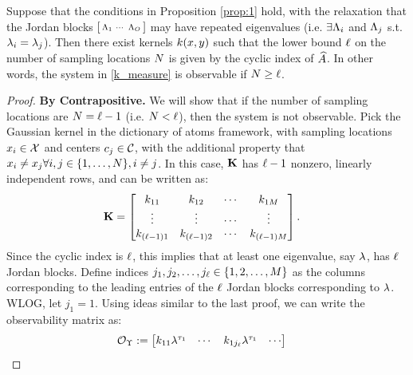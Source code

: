 \begin{proposition}\label{prop:2}
 Suppose that the conditions in Proposition \ref{prop:1} hold, with the relaxation that
 the Jordan blocks $\left[\begin{smallmatrix}
                           \Lambda_1 &\cdots & \Lambda_{O}
                          \end{smallmatrix}\right]$ may have 
 repeated eigenvalues (i.e. $\exists \Lambda_i$ and $\Lambda_j$ s.t. $\lambda_i = \lambda_j$). Then there exist kernels $k(x,y)$ such that the lower bound $\ell$ on the number of sampling locations $N$ is given by the cyclic index of $\widehat{A}$. In other words, the system in \eqref{k_measure} is observable if $ N \geq \ell$.
\end{proposition}
\begin{proof}
	\textbf{By Contrapositive.} We will show that if the number of sampling locations are $ N=\ell-1 $ (i.e. $ N < \ell$), then the system is not observable. Pick the Gaussian kernel in the dictionary of atoms framework,
	with sampling locations $x_i\in\mathcal{X}$ and centers $c_j\in\mathcal{C}$, with the additional 
	property that $x_i\neq x_j \forall i,j\in\{1,\dots,N\}, i\neq j$.
	In this case, 
	$\mathbf{K}$ has $\ell-1$ nonzero, linearly independent rows, and can be written as:
	\begin{align*}
	\mathbf{K} &= \begin{bmatrix}
	k_{11} & k_{12} & \cdots & k_{1M} \\
	\vdots & \vdots & \cdots & \vdots \\
	k_{(\ell-1)1} & k_{(\ell-1)2} & \cdots & k_{(\ell-1)M} 
	\end{bmatrix}.
	\end{align*}
	Since the cyclic index is $\ell$, this implies that at least one eigenvalue, say $\lambda$, has $\ell$ Jordan blocks. 
	Define indices $j_1, j_2, \dots, j_{\ell} \in \{1,2,\dots,M\}$ as the columns corresponding to the leading entries of the $\ell$ Jordan blocks corresponding to $\lambda$. WLOG, let $j_1 = 1$. Using ideas similar to the last proof, we can write the observability matrix as:
	\begin{align*}
	\mathcal{O}_{\Upsilon}
	&:= 
	\begin{bmatrix}
	k_{11}\lambda^{\tau_1}  & \cdots & k_{1j_{\ell}}\lambda^{\tau_1} & \cdots\\

\end{bmatrix}
\end{align*}
\end{proof}
